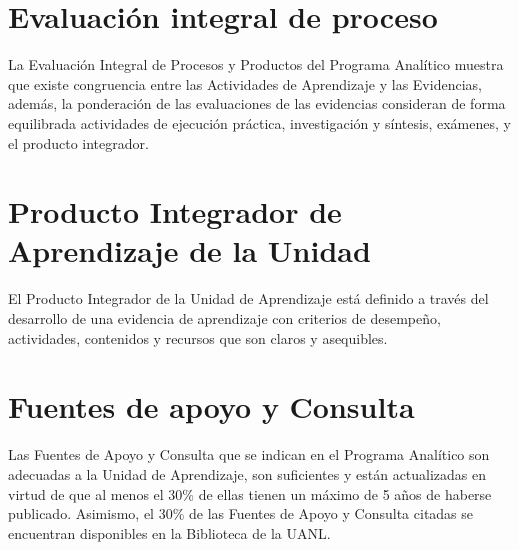 \documentclass{article}
\begin{document}
\begin{Form}
\section{Evaluaci\'{o}n integral de proceso}

La Evaluaci\'{o}n Integral de Procesos y Productos del Programa Anal\'{i}tico muestra que existe
congruencia entre las Actividades de Aprendizaje y las Evidencias, adem\'{a}s, la ponderaci\'{o}n
de las evaluaciones de las evidencias consideran de forma equilibrada actividades de
ejecuci\'{o}n pr\'{a}ctica, investigaci\'{o}n y s\'{i}ntesis, ex\'{a}menes, y el producto integrador.
\begin{flushright}
%
  \quad%
\end{flushright}
  
\section{Producto Integrador de Aprendizaje de la Unidad}

El Producto Integrador de la Unidad de Aprendizaje est\'{a} definido a trav\'{e}s del desarrollo de
una evidencia de aprendizaje con criterios de desempe\~{n}o, actividades, contenidos y
recursos que son claros y asequibles.
\begin{flushright}
%
  \quad%
\end{flushright}
  
\section{Fuentes de apoyo y Consulta}

Las Fuentes de Apoyo y Consulta que se indican en el Programa Anal\'{i}tico son adecuadas a
la Unidad de Aprendizaje, son suficientes y est\'{a}n actualizadas en virtud de que al menos el
30\% de ellas tienen un m\'{a}ximo de 5 a\~{n}os de haberse publicado. Asimismo, el 30\% de las
Fuentes de Apoyo y Consulta citadas se encuentran disponibles en la Biblioteca de la
UANL.
\begin{flushright}
  \quad
\end{flushright}



\end{Form}
\end{document}
